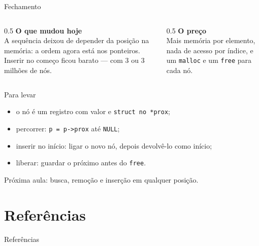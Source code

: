 \documentclass[aspectratio=169]{beamer}
\begin{document}
\begin{frame}{Fechamento}
  \begin{columns}[T]
    \begin{column}{0.5\textwidth}
      \textbf{O que mudou hoje}\\[0.3em]
      \small A sequência deixou de depender da posição na memória: a ordem
      agora está nos ponteiros. Inserir no começo ficou barato --- com 3 ou
      3 milhões de nós.
    \end{column}
    \begin{column}{0.5\textwidth}
      \textbf{O preço}\\[0.3em]
      \small Mais memória por elemento, nada de acesso por índice, e um
      \texttt{malloc} e um \texttt{free} para cada nó.
    \end{column}
  \end{columns}
  \begin{block}{Para levar}
    \begin{itemize}
      \small
      \item o nó é um registro com valor e \texttt{struct no *prox};
      \item percorrer: \texttt{p = p->prox} até \texttt{NULL};
      \item inserir no início: ligar o novo nó, depois devolvê-lo como início;
      \item liberar: guardar o próximo antes do \texttt{free}.
    \end{itemize}
  \end{block}
  \small\textcolor{UFSGray}{Próxima aula: busca, remoção e inserção em
  qualquer posição.}
\end{frame}

\section*{Referências}
\begin{frame}[allowframebreaks]{Referências}
  \nocite{*}
  
  
\end{frame}
\end{document}

